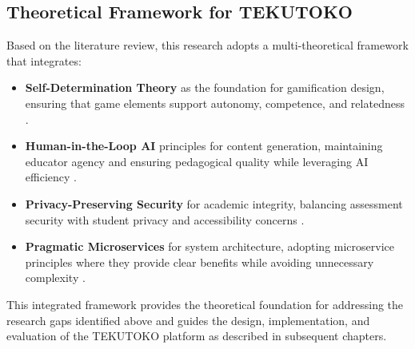\subsection{Theoretical Framework for TEKUTOKO}

Based on the literature review, this research adopts a multi-theoretical framework that integrates:

\begin{itemize}
    \item \textbf{Self-Determination Theory} as the foundation for gamification design, ensuring that game elements support autonomy, competence, and relatedness \citep{deci2020}.
    
    \item \textbf{Human-in-the-Loop AI} principles for content generation, maintaining educator agency and ensuring pedagogical quality while leveraging AI efficiency \citep{kasneci2023}.
    
    \item \textbf{Privacy-Preserving Security} for academic integrity, balancing assessment security with student privacy and accessibility concerns \citep{balderas2021}.
    
    \item \textbf{Pragmatic Microservices} for system architecture, adopting microservice principles where they provide clear benefits while avoiding unnecessary complexity \citep{richards2020}.
\end{itemize}

This integrated framework provides the theoretical foundation for addressing the research gaps identified above and guides the design, implementation, and evaluation of the TEKUTOKO platform as described in subsequent chapters.
